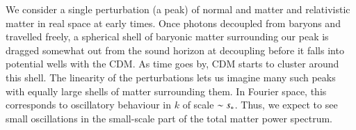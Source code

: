 
    We consider a single perturbation (a peak) of normal and matter and relativistic matter in real space at early times. Once photons decoupled from baryons and travelled freely, a spherical shell of baryonic matter surrounding our peak is dragged somewhat out from the sound horizon at decoupling before it falls into potential wells with the CDM. As time goes by, CDM starts to cluster around this shell. The linearity of the perturbations lets us imagine many such peaks with equally large shells of matter surrounding them. In Fourier space, this corresponds to oscillatory behaviour in $k$ of scale $\sim s_*$. Thus, we expect to see small oscillations in the small-scale part of the total matter power spectrum.



    
    




    